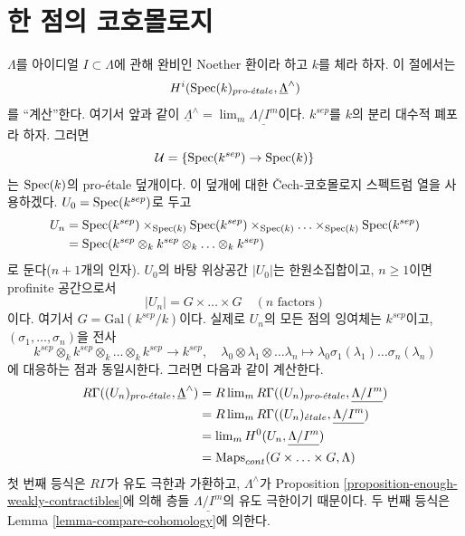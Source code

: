 \section{한 점의 코호몰로지}
\label{section-cohomology-point}

\noindent
$\Lambda$를 아이디얼 $I \subset \Lambda$에 관해 완비인 Noether 환이라
하고 $k$를 체라 하자. 이 절에서는
$$
H^i(\mathop{\mathrm{Spec}}(k)_{pro\text{-}\acute{e}tale}, \underline{\Lambda}^\wedge)
$$
를 ``계산''한다. 여기서 앞과 같이
$\underline{\Lambda}^\wedge = \lim_m \underline{\Lambda/I^m}$이다.
$k^{sep}$를 $k$의 분리 대수적 폐포라 하자. 그러면
$$
\mathcal{U} = \{\mathop{\mathrm{Spec}}(k^{sep}) \to \mathop{\mathrm{Spec}}(k)\}
$$
는 $\mathop{\mathrm{Spec}}(k)$의 pro-\'etale 덮개이다. 이 덮개에 대한
\v{C}ech-코호몰로지 스펙트럼 열을 사용하겠다.
$U_0 = \mathop{\mathrm{Spec}}(k^{sep})$로 두고
\begin{align*}
U_n & =
\mathop{\mathrm{Spec}}(k^{sep}) \times_{\mathop{\mathrm{Spec}}(k)}
\mathop{\mathrm{Spec}}(k^{sep}) \times_{\mathop{\mathrm{Spec}}(k)} \ldots
\times_{\mathop{\mathrm{Spec}}(k)} \mathop{\mathrm{Spec}}(k^{sep}) \\
& =
\mathop{\mathrm{Spec}}(k^{sep} \otimes_k k^{sep} \otimes_k \ldots \otimes_k k^{sep})
\end{align*}
로 둔다($n + 1$개의 인자). $U_0$의 바탕 위상공간 $|U_0|$는
한원소집합이고, $n \geq 1$이면 profinite 공간으로서
$$
|U_n| = G \times \ldots \times G\quad (n\text{ factors})
$$
이다. 여기서 $G = \text{Gal}(k^{sep}/k)$이다. 실제로 $U_n$의 모든
점의 잉여체는 $k^{sep}$이고, $(\sigma_1, \ldots, \sigma_n)$을 전사
$$
k^{sep} \otimes_k k^{sep} \otimes_k \ldots \otimes_k k^{sep}
\longrightarrow k^{sep}, \quad
\lambda_0 \otimes \lambda_1 \otimes \ldots \lambda_n
\longmapsto \lambda_0 \sigma_1(\lambda_1) \ldots \sigma_n(\lambda_n)
$$
에 대응하는 점과 동일시한다. 그러면 다음과 같이 계산한다.
\begin{align*}
R\Gamma((U_n)_{pro\text{-}\acute{e}tale}, \underline{\Lambda}^\wedge)
& =
R\mathop{\mathrm{lim}}\nolimits_m R\Gamma((U_n)_{pro\text{-}\acute{e}tale}, \underline{\Lambda/I^m}) \\
& =
R\mathop{\mathrm{lim}}\nolimits_m R\Gamma((U_n)_{\acute{e}tale}, \underline{\Lambda/I^m}) \\
& =
\mathop{\mathrm{lim}}\nolimits_m H^0(U_n, \underline{\Lambda/I^m}) \\
& = 
\text{Maps}_{cont}(G \times \ldots \times G, \Lambda)
\end{align*}
첫 번째 등식은 $R\Gamma$가 유도 극한과 가환하고,
$\Lambda^\wedge$가 Proposition
\ref{proposition-enough-weakly-contractibles}에 의해 층들
$\underline{\Lambda/I^m}$의 유도 극한이기 때문이다.
두 번째 등식은 Lemma \ref{lemma-compare-cohomology}에 의한다.
